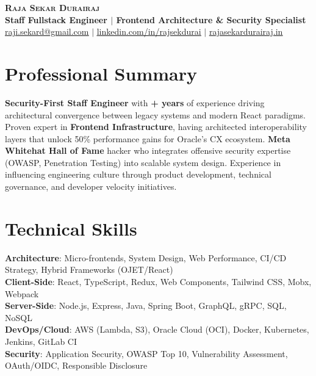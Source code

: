 \documentclass[letterpaper,11pt]{article}
\newcounter{TotalYears}
\begin{document}
\begin{center}
    \textbf{\Huge \scshape Raja Sekar Durairaj} \\ \vspace{3pt}
    \textbf{\large Staff Fullstack Engineer $|$ Frontend Architecture \& Security Specialist} \\ \vspace{3pt}
    \small \href{mailto:raji.sekard@gmail.com}{\underline{raji.sekard@gmail.com}} $|$ 
    \href{https://www.linkedin.com/in/rajsekdurai/?utm_source=resume&utm_medium=article&utm_campaign=job_search}{\underline{linkedin.com/in/rajsekdurai}} $|$
    \href{https://www.rajasekardurairaj.in?utm_source=resume&utm_medium=article&utm_campaign=job_search}{\underline{rajasekardurairaj.in}}
\end{center}


\section{Professional Summary}
\small{
\textbf{Security-First Staff Engineer} with \textbf{\the\value{TotalYears}+ years} of experience driving architectural convergence between legacy systems and modern React paradigms. Proven expert in \textbf{Frontend Infrastructure}, having architected interoperability layers that unlock 50\% performance gains for Oracle's CX ecosystem. \textbf{Meta Whitehat Hall of Fame} hacker who integrates offensive security expertise (OWASP, Penetration Testing) into scalable system design. Experience in influencing engineering culture through product development, technical governance, and developer velocity initiatives}.

\vspace{2pt}


\section{Technical Skills}
 \begin{itemize}[leftmargin=0.15in, label={}]
    \small{\item{
     \textbf{Architecture}{: Micro-frontends, System Design, Web Performance, CI/CD Strategy, Hybrid Frameworks (OJET/React)} \\
     \textbf{Client-Side}{: React, TypeScript, Redux, Web Components, Tailwind CSS, Mobx, Webpack} \\
     \textbf{Server-Side}{: Node.js, Express, Java, Spring Boot, GraphQL, gRPC, SQL, NoSQL} \\
     \textbf{DevOps/Cloud}{: AWS (Lambda, S3), Oracle Cloud (OCI), Docker, Kubernetes, Jenkins, GitLab CI} \\
     \textbf{Security}{: Application Security, OWASP Top 10, Vulnerability Assessment, OAuth/OIDC, Responsible Disclosure}
    }}
 \end{itemize}
\end{document}
